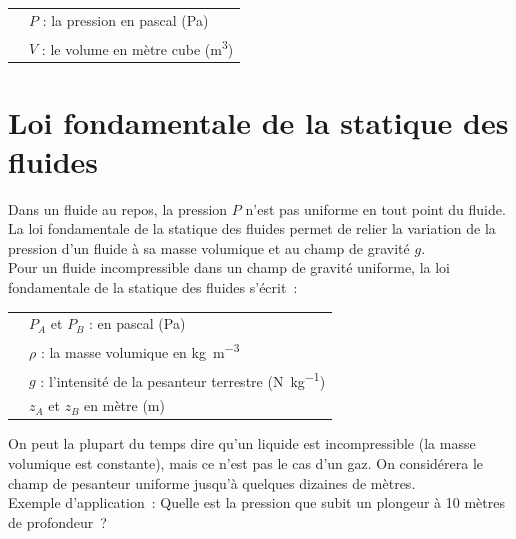 \documentclass[a4paper,11pt,fleqn]{article}%
\begin{document}
	\begin{center}
		\begin{tabular}{>{\centering}m{.3\linewidth}|m{.6\linewidth}}
			\multirow{2}{*}{$P \cdot V =cste$} & $P$ :  la pression en pascal (\unit{\pascal})\\
			& $V$ : le volume en mètre cube (\unit{\meter\cubed})\\
		\end{tabular}
	\end{center}
	
\section{Loi fondamentale de la statique des fluides}
	Dans un fluide au repos, la pression $P$ n’est pas uniforme en tout point du fluide. La loi fondamentale de la statique des fluides permet de relier la variation de la pression d’un fluide à sa masse volumique et au champ de gravité $g$.\\
	Pour un fluide incompressible dans un champ de gravité uniforme, la loi fondamentale de la statique des fluides s’écrit :
	\begin{center}
		\begin{tabular}{>{\centering}m{.3\linewidth}|m{.6\linewidth}}
			\multirow{4}{*}{$ P_A - P_B = \rho \cdot g \cdot (z_B - z_A)$} & $P_A$ et $P_B$ : en pascal (\unit{\pascal})\\
			& $\rho$ : la masse volumique en \unit{\kilo\gram\per\meter\cubed}\\
			& $g$ : l'intensité de la pesanteur terrestre (\unit{\newton\per\kilo\gram})\\
			& $z_A$ et $z_B$ en mètre (\unit{\meter})\\
		\end{tabular}
	\end{center}
	
	On peut la plupart du temps dire qu’un liquide est incompressible (la masse volumique est constante), mais ce n’est pas le cas d’un gaz. On considérera le champ de pesanteur uniforme jusqu’à quelques dizaines de mètres.\\
	Exemple d’application :
	Quelle est la pression que subit un plongeur à 10 mètres de profondeur ?
\end{document}
